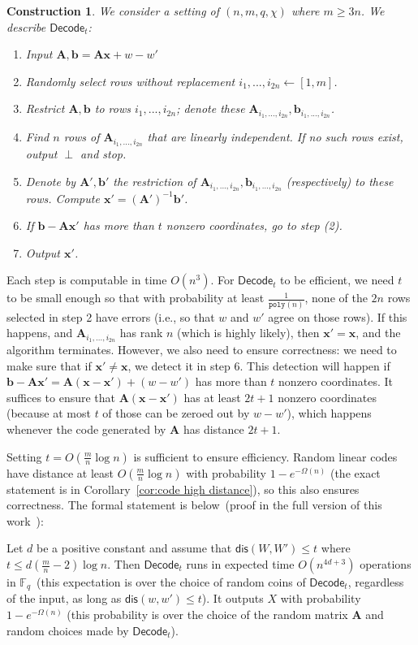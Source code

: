 \documentclass{llncs}
\newcommand{\corref}[1]{\mbox{Corollary~\ref{#1}}}
\newcommand{\vect}[1]{\ensuremath{\mathbf{#1}}}
\newcommand{\Fq}{\ensuremath{\mathbb{F}_q}}
\newcommand{\dis}{\ensuremath{\mathsf{dis}}}
\newcommand{\decode}{\ensuremath{\mathsf{Decode}}}
\newcommand{\poly}{\ensuremath{\mathtt{poly}}\xspace}
\newtheorem{construction}{Construction}
\newcommand{\vA}{\vect{A}}
\newcommand{\vx}{\vect{x}}
\newcommand{\vb}{\vect{b}}
\begin{document}
\begin{construction}
\label{cons:decoding algorithm} We consider a setting of $(n, m, q, \chi)$ where $m\geq 3n$.  We describe $\decode_t$:
\begin{enumerate}
\item Input $\vA , \vb = \vA \vx + w - w'$
\item Randomly select rows without replacement $i_1,..., i_{2n}\leftarrow [1,m]$.  
\item Restrict $\vA, \vb$ to rows $i_1,...,i_{2n}$; denote these $\vA_{i_1,...,i_{2n}}, \vb_{i_1,...,i_{2n}}$.
\item Find $n$ rows of $\vA_{i_1,..., i_{2n}}$ that are linearly independent.  
If no such rows exist, output $\perp$ and stop.
\item Denote by $\vA', \vb'$ the restriction of $\vA_{i_1,..., i_{2n}}, \vb_{i_1,..., i_{2n}}$ (respectively) to these rows. Compute $\vx' = (\vA')^{-1}\vb'$.  
\item If $\vb- \vA \vx'$ has more than $t$ nonzero coordinates, go to step (2).
\item Output $\vx'$.
\end{enumerate}
\end{construction}

Each step is computable in time $O(n^3)$. 
For $\decode_t$ to be efficient, we need $t$ to be small enough so that  with probability at least $\frac{1}{\poly(n)}$, none of the $2n$ rows  selected  in step 2 have errors (i.e., so that $w$ and $w'$ agree on those rows).  If this happens, and $\vA_{i_1,...,i_{2n}}$ has rank  $n$ (which is highly likely), then $\vx'=\vx$, and the algorithm terminates.  However, we also need to ensure correctness: we need to make sure that if $\vx'\neq \vx$, we detect it in step 6.  This detection will happen if $\vb-\vA \vx' = \vA (\vx-\vx')+(w-w')$ has more than $t$ nonzero coordinates.  It suffices to ensure that $\vA (\vx-\vx')$ has at least $2t+1$ nonzero coordinates (because at most $t$ of those can be zeroed out by $w-w'$), which happens whenever the code generated by $\vA$ has distance $2t+1$.

Setting $t = O(\frac{m}{n}\log n)$ is sufficient to ensure efficiency.    Random linear codes have distance at least $O(\frac{m}{n}\log n)$ with probability $1-e^{-\Omega(n)}$ (the exact statement is in \corref{cor:code high distance}), so this also ensures correctness.
The formal statement is below~(proof in the full version of this work~\cite{fullerMengReyzin2013}):
\begin{lemma}[Efficiency of $\decode_t$ when $t\leq d (m/n-2)\log n$]
\label{lem:i t poly time}
Let $d$ be a positive constant and assume that $\dis(W, W')\leq t$ where $t\leq d(\frac{m}{n}-2)\log n$.  Then $\decode_t$ runs in expected time $O(n^{4d+3})$ operations in $\Fq$~(this expectation is over the choice of random coins of $\decode_t$, regardless of the input, as long as $\dis(w, w')\le t$).  It outputs $X$ with probability $1-e^{-\Omega(n)}$ (this probability is over the choice of the random matrix  $\vA$ and random choices made by $\decode_t$).
\end{lemma}
\end{document}
